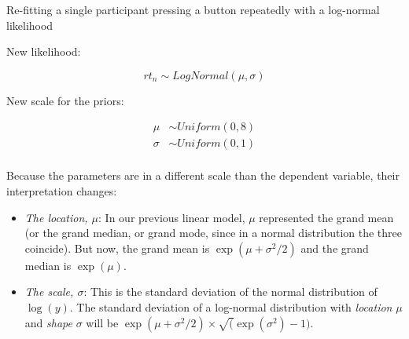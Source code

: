 \documentclass[12pt,ignorenonframetext,aspectratio=169]{beamer}
\providecommand{\tightlist}{%
  \setlength{\itemsep}{0pt}\setlength{\parskip}{0pt}}
\begin{document}
\begin{frame}{Re-fitting a single participant pressing a button repeatedly with a log-normal likelihood}
\protect\hypertarget{sec:lognormal}{}

\begin{block}{New likelihood:}

\begin{equation}
rt_n \sim LogNormal(\mu,\sigma)
\end{equation}

\end{block}

\begin{block}{New scale for the priors:}

\begin{equation}
\begin{aligned}
\mu &\sim Uniform(0, 8) \\
\sigma &\sim Uniform(0, 1) \\
\end{aligned}
\label{eq:logpriorsunif}
\end{equation}

\end{block}

\end{frame}

\begin{frame}

Because the parameters are in a different scale than the dependent variable, their interpretation changes:

\begin{itemize}
\tightlist
\item
  \emph{The location, \(\mu\)}: In our previous linear model, \(\mu\) represented the grand mean (or the grand median, or grand mode, since in a normal distribution the three coincide). But now, the grand mean is \(\exp(\mu +\sigma ^{2}/2)\) and the grand median is \(\exp(\mu)\). 
\item
  \emph{The scale, \(\sigma\)}: This is the standard deviation of the normal distribution of \(\log(y)\). The standard deviation of a log-normal distribution with \emph{location} \(\mu\) and \emph{shape} \(\sigma\) will be \(\exp(\mu +\sigma ^{2}/2)\times \sqrt(\exp(\sigma^2)- 1)\). 
\end{itemize}

\end{frame}
\end{document}
